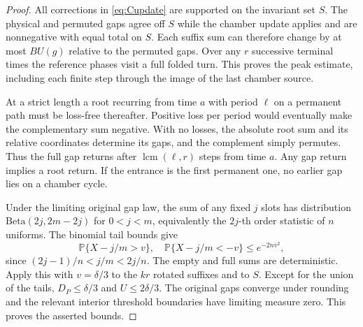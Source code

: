 \documentclass[11pt]{amsart}
\theoremstyle{definition}
\DeclareMathOperator{\lcm}{lcm}
\newcommand{\PP}{\mathbb P}
\begin{document}
\begin{proof}
All corrections in \eqref{eq:Cupdate} are supported on
the invariant set \(S\). The physical and permuted gaps
agree off \(S\) while the chamber update applies and are
nonnegative with equal total on \(S\). Each suffix sum
can therefore change by at most \(BU(g)\) relative to the
permuted gaps. Over any \(r\) successive terminal times
the reference phases visit a full folded turn. This
proves the peak estimate, including each finite step
through the image of the last chamber source.

At a strict length a root recurring from time \(a\)
with period \(\ell\) on a permanent path must be loss-free
thereafter. Positive loss per period would eventually
make the complementary sum negative. With no losses,
the absolute root sum and its relative coordinates determine
its gaps, and the complement simply permutes. Thus the
full gap returns after \(\lcm(\ell,r)\) steps from time \(a\).
Any gap return implies a root return. If the entrance is the
first permanent one, no earlier gap lies on a chamber cycle.

Under the limiting original gap law, the sum of any fixed
\(j\) slots has distribution \(\mathrm{Beta}(2j,2m-2j)\)
for \(0<j<m\), equivalently the \(2j\)-th order statistic
of \(n\) uniforms. The binomial tail bounds
\cite[Theorem~2]{Hoeffding} give
\[
 \PP\{X-j/m>v\},\quad \PP\{X-j/m<-v\}\le e^{-2nv^2},
\]
since \((2j-1)/n<j/m<2j/n\).
The empty and full sums are deterministic. Apply this with
\(v=\delta/3\) to the \(kr\) rotated suffixes and to \(S\).
Except for the union of the tails, \(D_P\le\delta/3\)
and \(U\le2\delta/3\). The original gaps converge under
rounding and the relevant interior threshold boundaries
have limiting measure zero. This proves the asserted bounds.
\end{proof}
\end{document}

